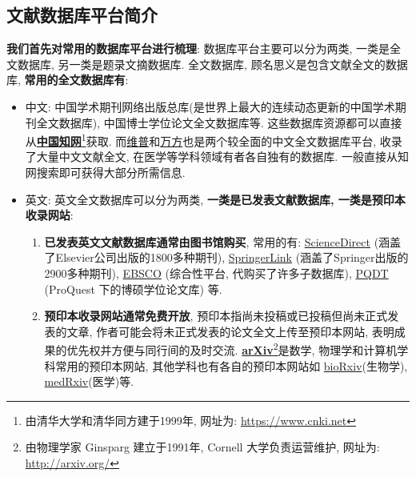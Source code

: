 \documentclass{booki}
\begin{document}
\subsection{文献数据库平台简介}
{\textbf{我们首先对常用的数据库平台进行梳理}}: 数据库平台主要可以分为两类, 一类是全文数据库, 另一类是题录文摘数据库. 全文数据库, 顾名思义是包含文献全文的数据库, \textbf{常用的全文数据库有}:
\begin{itemize}
    \item 中文: 中国学术期刊网络出版总库(是世界上最大的连续动态更新的中国学术期刊全文数据库), 中国博士学位论文全文数据库等. 这些数据库资源都可以直接从\textbf{\href{https://www.cnki.net/}{中国知网}}\footnote{由清华大学和清华同方建于1999年, 网址为: \url{https://www.cnki.net}}获取. 而\href{http://www.cqvip.com/}{维普}和\href{https://new.wanfangdata.com.cn/index.html}{万方}也是两个较全面的中文全文数据库平台, 收录了大量中文文献全文, 在医学等学科领域有者各自独有的数据库. 一般直接从知网搜索即可获得大部分所需信息{.}
    \item 英文: 英文全文数据库可以分为两类, \textbf{一类是已发表文献数据库, 一类是预印本收录网站}:
          \begin{enumerate}
              \item \textbf{已发表英文文献数据库通常由图书馆购买}, 常用的有: \href{https://www.sciencedirect.com/}{ScienceDirect} (涵盖了Elsevier公司出版的1800多种期刊), \href{https://link.springer.com/}{SpringerLink} (涵盖了Springer出版的2900多种期刊), \href{https://www.ebsco.com}{EBSCO} (综合性平台, 代购买了许多子数据库), \href{http://www.pqdtcn.com/}{PQDT}
                    (ProQuest 下的博硕学位论文库) 等{.}
              \item \textbf{预印本收录网站通常免费开放}, 预印本指尚未投稿或已投稿但尚未正式发表的文章, 作者可能会将未正式发表的论文全文上传至预印本网站, 表明成果的优先权并方便与同行间的及时交流. \textbf{\href{http://arxiv.org/}{arXiv}}\footnote{由物理学家 Ginsparg 建立于1991年, Cornell 大学负责运营维护, 网址为: \url{http://arxiv.org/}}是数学, 物理学和计算机学科常用的预印本网站, 其他学科也有各自的预印本网站如 \href{https://www.biorxiv.org/}{bioRxiv}(生物学), \href{https://www.medrxiv.org/}{medRxiv}(医学)等.
          \end{enumerate}
\end{itemize}
\end{document}
